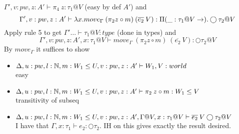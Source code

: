 \documentclass{article}
\begin{document}
\begin{itemize}
\begin{itemize}
\begin{itemize}
    $\Gamma', v: pw, z:A'  \vdash \pi_4 \: z : \tau_1 @ V$ (easy by def $A'$) and
    \[\Gamma', v: pw, z:A' \vdash \lambda x. move_{\Gamma} \: (\pi_2 z \circ m) \: (\overline{e_2} \:V) :
    \Pi(\_ : \tau_1 @ V \rightarrow ).\bigcirc \tau_2 @ V
    \] 
    Apply rule 5 to get $\Gamma' \dots \vdash  \tau_1 @ V : type$ (done in types) and 
    \[\Gamma', v: pw, z:A', x: \tau_1 @ V \vdash move_{\Gamma} \: (\pi_2 z \circ m) \: (\overline{e_2} \:V) : \bigcirc \tau_2 @ V\]
    By $move_{\Gamma}$ it suffices to show
    \begin{itemize}
        \item $\Delta, u: pw, l: \mathbb{N}, m: W_1 \leq U, v: pw, z:A' \vdash W_1, V: world$\\
        easy
        \item $\Delta, u: pw, l: \mathbb{N}, m: W_1 \leq U, v: pw, z:A' \vdash \pi_2 \: z \circ m : W_1 \leq V$\\
        transitivity of subseq
        \item $\Delta, u: pw, l: \mathbb{N}, m: W_1 \leq U, v: pw, z:A', \Gamma @ V, x: \tau_1 @V \vdash \overline{e_2} \:V\bigcirc \tau_2 @ V$\\
        I have that $\Gamma, x: \tau_1 \vdash e_2 : \bigcirc \tau_2$. IH on this gives exactly the result desired.
    \end{itemize}
    

\end{itemize}
\end{itemize}
\end{itemize}
\end{document}
